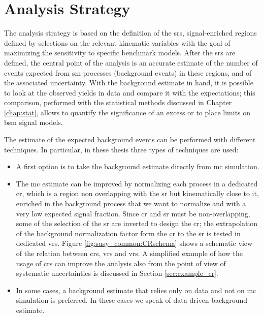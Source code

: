 \section{Analysis Strategy}

The analysis strategy is based on the definition of the \glspl{sr}, signal-enriched regions defined by selections on the relevant kinematic variables with the goal of maximizing the sensitivity to specific benchmark models. 
After the \glspl{sr} are defined, the central point of the analysis is an accurate estimate of the number of events expected from \gls{sm} processes (background events) in these regions, and of the associated uncertainty. 
With the background estimate in hand, it is possible to look at the observed yields in data and compare it with the expectations;
this comparison, performed with the statistical methods discussed in Chapter \ref{chap:stat}, allows to quantify the significance of an excess or to place limits on \gls{bsm} signal models.

The estimate of the expected background events can be performed with different techniques. In particular, in these thesis three types of techniques are used:
\begin{itemize}
\item A first option is to take the background estimate directly from \gls{mc} simulation. 
\item The \gls{mc} estimate can be improved by normalizing each process in a dedicated \gls{cr}, which is a region non overlapping with the \gls{sr} but kinematically close to it, enriched in the background process that we want to normalize and with a very low expected signal fraction. Since \gls{cr} and \gls{sr} must be non-overlapping, some of the selection of the \gls{sr} are inverted to design the \gls{cr}; the extrapolation of the background normalization factor form the \gls{cr} to the \gls{sr} is tested in dedicated \glspl{vr}. Figure \ref{fig:susy_common:CRschema} shows a schematic view of the relation between \glspl{cr}, \glspl{vr} and \glspl{vr}. A simplified example of how the usage of \glspl{cr} can improve the analysis also from the point of view of systematic uncertainties is discussed in Section \ref{sec:example_cr}. 
\item In some cases, a background estimate that relies only on data and not on \gls{mc} simulation is preferred. In these cases we speak of data-driven background estimate.
\end{itemize}

